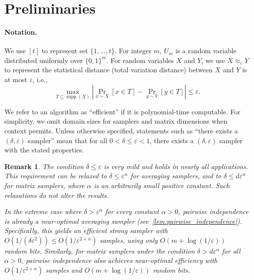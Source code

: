 \documentclass[11pt,letterpaper]{article}
\newtheorem{remark}[theorem]{Remark}
\DeclareMathOperator*{\supp}{supp}
\newcommand{\eps}{\varepsilon}
\newcommand{\1}{\mathbbm{1}}
\newcommand{\abs}[1]{\left|#1\right| }
\newcommand{\zo}{\{0, 1\}}
\begin{document}
\section{Preliminaries}

\paragraph{Notation.}  We use $[t]$ to represent set $\{1, \dots, t\}$. For integer $m$, $U_m$ is a random variable distributed uniformly over $\zo^m$. For random variables $X$ and $Y$, we use $X \approx_{\eps} Y$ to represent the statistical distance (total variation distance) between $X$ and $Y$ is at most $\eps$, i.e., \[
    \max_{T \subseteq \supp(X)} \abs{\Pr_{x \sim X}[x \in T] - \Pr_{y \sim Y}[y \in T]} \le \eps.
\]


We refer to an algorithm as ``efficient'' if it is polynomial-time computable.
For simplicity, we omit domain sizes for samplers and matrix dimensions when context permits. Unless otherwise specified, statements such as “there exists a \( (\delta, \eps) \) sampler” mean that for all \( 0 < \delta \le \eps < 1 \), there exists a \( (\delta, \eps) \) sampler with the stated properties.
\begin{remark}
    \label{rem:choice_of_parameters}
    The condition $\delta \le \eps$ is very mild and holds in nearly all applications.
    This requirement can be relaxed to \( \delta \le  \eps^\alpha \)  for averaging samplers, and to \( \delta \le d\eps^\alpha \) for matrix samplers, where $\alpha$ is an arbitrarily small positive constant. Such relaxations do not alter the results.

    In the extreme case where $\delta > \eps^\alpha$ for every constant $\alpha > 0$, pairwise independence is already a near-optimal averaging sampler (see~\cref{lem:pairwise_independence}). Specifically, this yields an efficient strong sampler with $O(1 / (\delta \eps^2)) \le O(1 / \eps^{2+\alpha})$ samples, using only $O(m + \log (1 / \eps))$ random bits. 
    Similarly, for matrix samplers under the condition \( \delta > d \eps^\alpha \) for all \( \alpha > 0 \), pairwise independence also achieves near-optimal efficiency with \( O(1 / \eps^{2+\alpha}) \) samples and \( O(m + \log (1 / \eps)) \) random bits.
\end{remark}
\end{document}
